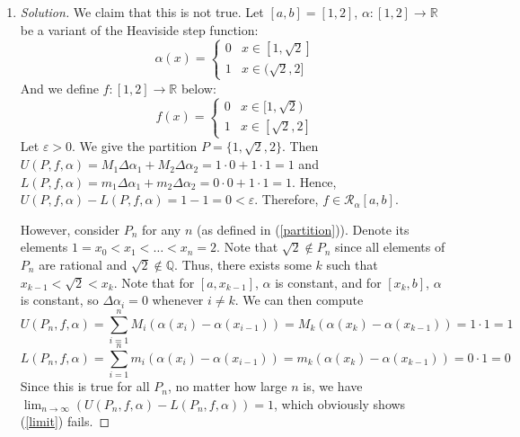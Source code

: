 \documentclass{article}
\newcommand{\Q}{{\mathbb Q}}
\newcommand{\R}{{\mathbb R}}
\newcommand{\ep}{{\varepsilon}}
\begin{document}
\begin{enumerate}
\begin{proof}[Solution]
			We now make our final push:
			\begin{align*}
				U(P_n,f) - L(P_n,f)
				&= \sum_j (M_j - m_j)\Delta y_j\\
				&\leq \sum_{j \not\in S}(M_j - m_j)\Delta y_j
				+ \sum_{j \in S}(M_j - m_j)\Delta y_j\\
				&\leq \sum_{j \not\in S}(M_j - m_j)\Delta y_j
				+ \sum_{j \in S}B\Delta y_j\\
				&< \frac{\ep}{2} + \sum_{j\in S}B\frac{d}{n}\\
				&\leq \frac{\ep}{2} + 2K\frac{dB}{n}\\
				&< \frac{\ep}{2} + \frac{\ep}{2} = \ep
			\end{align*}
			as desired.
		\end{proof}
	\item \begin{proof}[Solution]\let\qed\relax
			We claim that this is not true.
			Let $[a,b] = [1,2]$, $\alpha \colon [1,2] \to \R$
			be a variant of the Heaviside step function:
			\[
				\alpha(x) = \begin{cases}
					0 & x \in [1,\sqrt{2}]\\
					1 & x \in (\sqrt{2},2]
				\end{cases}
			\]
			And we define $f \colon [1,2] \to \R$ below:
			\[
				f(x) = \begin{cases}
					0 & x \in [1,\sqrt{2})\\
					1 & x \in [\sqrt{2},2]
				\end{cases}
			\]
			Let $\ep > 0$.
			We give the partition $P = \{1, \sqrt{2}, 2\}$.
			Then $U(P,f,\alpha) = M_1\Delta \alpha_1 + M_2 \Delta\alpha_2 = 1\cdot0 + 1\cdot 1 = 1$
			and $L(P,f,\alpha) = m_1\Delta\alpha_1 + m_2\Delta\alpha_2
			= 0\cdot0 + 1\cdot 1 = 1$.
			Hence, $U(P,f,\alpha) - L(P,f,\alpha) = 1-1 = 0 < \ep$.
			Therefore, $f \in \mathcal{R}_\alpha[a,b]$.

			However, consider $P_n$ for any $n$ (as defined in (\ref{partition})).
			Denote its elements $1 = x_0 < x_1 < \dots < x_n = 2$.
			Note that $\sqrt{2} \not\in P_n$ since all elements of
			$P_n$ are rational and $\sqrt{2} \not\in \Q$.
			Thus, there exists some $k$ such that $x_{k-1} < \sqrt{2} < x_k$.
			Note that for $[a,x_{k-1}]$, $\alpha$ is constant,
			and for $[x_k,b]$, $\alpha$ is constant,
			so $\Delta\alpha_i = 0$ whenever $i\neq k$.
			We can then compute
			\[
				U(P_n,f,\alpha) = \sum_{i=1}^n M_i(\alpha(x_i) - \alpha(x_{i-1}))
				= M_k(\alpha(x_k) - \alpha(x_{k-1}))
				= 1\cdot1 = 1
			\]
			\[
				L(P_n,f,\alpha) = \sum_{i=1}^n m_i(\alpha(x_i) - \alpha(x_{i-1}))
				= m_k(\alpha(x_k) - \alpha(x_{k-1}))
				= 0\cdot 1 = 0
			\]
			Since this is true for all $P_n$, no matter how large $n$ is,
			we have $\lim_{n\to\infty}(U(P_n,f,\alpha) - L(P_n,f,\alpha)) = 1$,
			which obviously shows (\ref{limit}) fails.
		\end{proof}
\end{enumerate}
\end{document}
